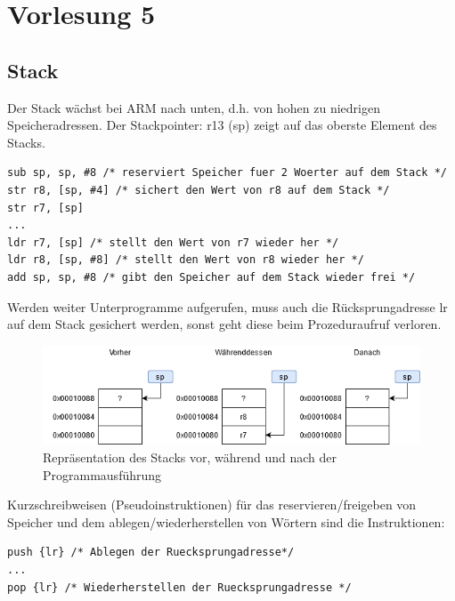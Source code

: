 \documentclass[a4paper,12pt,leqno]{article}
\begin{document}
\section{Vorlesung 5}
\subsection{Stack}
Der Stack wächst bei ARM nach unten, d.h. von hohen zu niedrigen Speicheradressen.
Der Stackpointer: r13 (sp) zeigt auf das oberste Element des Stacks.\\

\begin{lstlisting}
sub sp, sp, #8 /* reserviert Speicher fuer 2 Woerter auf dem Stack */
str r8, [sp, #4] /* sichert den Wert von r8 auf dem Stack */
str r7, [sp] 
...
ldr r7, [sp] /* stellt den Wert von r7 wieder her */
ldr r8, [sp, #8] /* stellt den Wert von r8 wieder her */
add sp, sp, #8 /* gibt den Speicher auf dem Stack wieder frei */
\end{lstlisting}

Werden weiter Unterprogramme aufgerufen, muss auch die Rücksprungadresse lr auf dem Stack gesichert werden, sonst geht diese beim Prozeduraufruf verloren.\\


\begin{figure}
\centering
\includegraphics[scale=0.7]{Grafiken/stackManipulation.png}
\caption{Repräsentation des Stacks vor, während und nach der Programmausführung}
\end{figure}

Kurzschreibweisen (Pseudoinstruktionen) für das reservieren/freigeben von Speicher und dem ablegen/wiederherstellen von Wörtern sind die Instruktionen:
\begin{lstlisting}
push {lr} /* Ablegen der Ruecksprungadresse*/
...
pop {lr} /* Wiederherstellen der Ruecksprungadresse */
\end{lstlisting}
\end{document}
